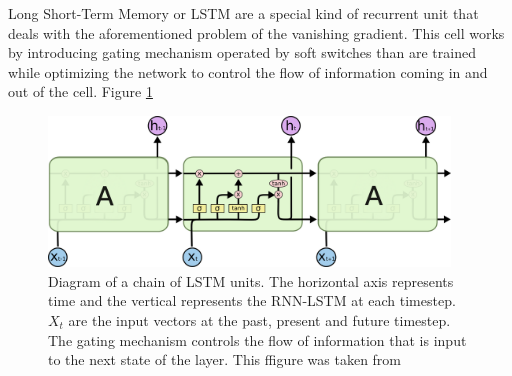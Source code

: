 Long Short-Term Memory \cite{hochreiter1997long} or LSTM are a special kind of recurrent unit that deals with the aforementioned problem of the vanishing gradient. This cell works by introducing gating mechanism operated by soft switches than are trained while optimizing the network to control the flow of information coming in and out of the cell. Figure \ref{fig:lstm}

\begin{figure}[h]
    \centering
    \includegraphics[height=4cm]{figures/lstm-chain}
    \caption{Diagram of a chain of LSTM units. The horizontal axis represents time and the vertical represents the RNN-LSTM at each timestep. $X_t$ are the input vectors at the past, present and future timestep. The gating mechanism controls the flow of information that is input to the next state of the layer. This ffigure was taken from \cite{lstm}}
    \label{fig:lstm}
\end{figure}

